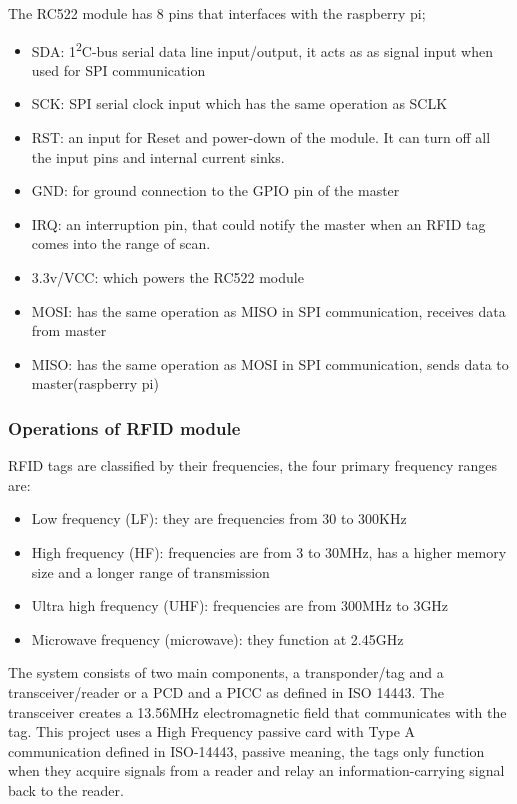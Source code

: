The RC522 module has 8 pins that interfaces with the raspberry pi;
\begin{itemize}
  \item SDA: 1\textsuperscript{2}C-bus serial data line input/output, it acts as as signal input when used for SPI communication
  \item SCK: SPI serial clock input which has the same operation as SCLK
  \item RST: an input for Reset and power-down of the module. It can turn off all the input pins and internal current sinks. 
  \item GND: for ground connection to the GPIO pin of the master
  \item IRQ: an interruption pin, that could notify the master when an RFID tag comes into the range of scan.
  \item 3.3v/VCC: which powers the RC522 module
  \item MOSI: has the same operation as MISO in SPI communication, receives data from master
  \item MISO: has the same operation as MOSI in SPI communication, sends data to master(raspberry pi)
\end{itemize}

\subsubsection{Operations of RFID module}
RFID tags are classified by their frequencies, the four primary frequency ranges are:
\begin{itemize}
  \item Low frequency (LF): they are frequencies from 30 to 300KHz
  \item High frequency (HF): frequencies are from 3 to 30MHz, has a higher memory size and a longer range of transmission
  \item Ultra high frequency (UHF): frequencies are from 300MHz to 3GHz
  \item Microwave frequency (microwave): they function at 2.45GHz 
\end{itemize}
The system consists of two main components, a transponder/tag and a transceiver/reader or a PCD and a PICC as defined in ISO 14443. The transceiver creates a 13.56MHz electromagnetic field that communicates with the tag. 
This project uses a High Frequency passive card with Type A communication defined in ISO-14443, passive meaning, the tags only function when they acquire signals from a reader and relay an information-carrying signal back to the reader. 



